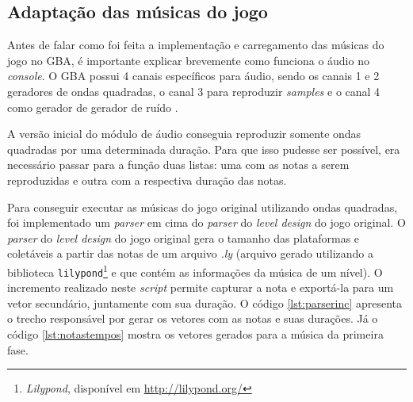 \subsection{Adaptação das músicas do jogo}

Antes de falar como foi feita a implementação e carregamento das músicas do jogo no GBA, é importante explicar brevemente como funciona o áudio no \textit{console}. O GBA possui 4 canais específicos para áudio, sendo os canais 1 e 2 geradores de ondas quadradas, o canal 3 para reproduzir \textit{samples} e o canal 4 como gerador de gerador de ruído \cite{tonc}.

A versão inicial do módulo de áudio conseguia reproduzir somente ondas quadradas por uma determinada duração. Para que isso pudesse ser possível, era necessário passar para a função duas listas: uma com as notas a serem reproduzidas e outra com a respectiva duração das notas.

Para conseguir executar as músicas do jogo original utilizando ondas quadradas, foi implementado um \textit{parser} em cima do \textit{parser} do \textit{level design} do jogo original. O \textit{parser} do \textit{level design} do jogo original gera o tamanho das plataformas e coletáveis a partir das notas de um arquivo \textit{.ly} (arquivo gerado utilizando a biblioteca \texttt{lilypond}\footnote{\textit{Lilypond}, disponível em \url{http://lilypond.org/}} e que contém as informações da música de um nível). O incremento realizado neste \textit{script} permite capturar a nota e exportá-la para um vetor secundário, juntamente com sua duração. O código \ref{lst:parserinc} apresenta o trecho responsável por gerar os vetores com as notas e suas durações. Já o código \ref{lst:notastempos} mostra os vetores gerados para a música da primeira fase.

